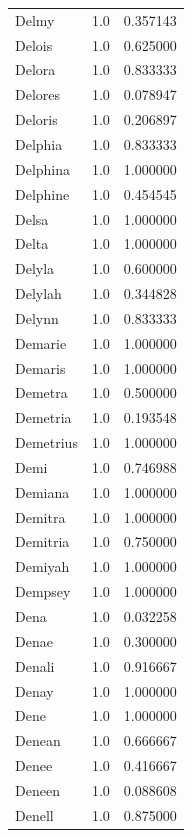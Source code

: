 \documentclass[
  letterpaper,
  DIV=11,
  numbers=noendperiod]{scrreprt}
\begin{document}
\begin{tabular}{lrr}
Delmy           &   1.0 &   0.357143 \\
Delois          &   1.0 &   0.625000 \\
Delora          &   1.0 &   0.833333 \\
Delores         &   1.0 &   0.078947 \\
Deloris         &   1.0 &   0.206897 \\
Delphia         &   1.0 &   0.833333 \\
Delphina        &   1.0 &   1.000000 \\
Delphine        &   1.0 &   0.454545 \\
Delsa           &   1.0 &   1.000000 \\
Delta           &   1.0 &   1.000000 \\
Delyla          &   1.0 &   0.600000 \\
Delylah         &   1.0 &   0.344828 \\
Delynn          &   1.0 &   0.833333 \\
Demarie         &   1.0 &   1.000000 \\
Demaris         &   1.0 &   1.000000 \\
Demetra         &   1.0 &   0.500000 \\
Demetria        &   1.0 &   0.193548 \\
Demetrius       &   1.0 &   1.000000 \\
Demi            &   1.0 &   0.746988 \\
Demiana         &   1.0 &   1.000000 \\
Demitra         &   1.0 &   1.000000 \\
Demitria        &   1.0 &   0.750000 \\
Demiyah         &   1.0 &   1.000000 \\
Dempsey         &   1.0 &   1.000000 \\
Dena            &   1.0 &   0.032258 \\
Denae           &   1.0 &   0.300000 \\
Denali          &   1.0 &   0.916667 \\
Denay           &   1.0 &   1.000000 \\
Dene            &   1.0 &   1.000000 \\
Denean          &   1.0 &   0.666667 \\
Denee           &   1.0 &   0.416667 \\
Deneen          &   1.0 &   0.088608 \\
Denell          &   1.0 &   0.875000 \\

\end{tabular}
\end{document}
